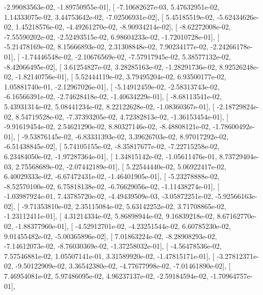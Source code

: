 \documentclass{article}
\begin{document}
         -2.99083563e-02,  -1.89750955e-01],
       [ -7.10682627e-03,   5.47632951e-02,   1.14333075e-02,
          3.44753642e-02,  -7.02506931e-02],
       [  5.45185519e-02,  -5.62434626e-02,   1.45218576e-02,
         -4.49261270e-02,  -8.90934214e-02],
       [ -8.62272008e-02,  -7.55590202e-02,  -2.52493515e-02,
          6.98604233e-02,  -1.72010728e-01],
       [ -5.21478169e-02,   8.15666893e-02,   2.31308848e-02,
          7.90234177e-02,  -2.24266178e-01],
       [ -1.74446548e-02,  -2.10676569e-02,  -7.57917945e-02,
          5.38577132e-02,  -8.42066495e-02],
       [  3.61254827e-02,   3.28285163e-02,  -1.28291736e-02,
          8.92526248e-02,  -1.82140756e-01],
       [  5.52444119e-02,   3.79495204e-02,   6.93500177e-02,
          1.05881740e-01,  -2.12967026e-01],
       [ -5.14912459e-02,  -2.58313743e-02,  -6.16566391e-02,
         -2.74628418e-02,  -1.40634229e-01],
       [ -8.68113541e-02,   5.43931314e-02,   5.08441234e-02,
          8.22122628e-02,  -1.08360367e-01],
       [ -2.18729824e-02,   8.54719528e-02,  -7.37393205e-02,
          4.72382813e-02,  -1.36153454e-01],
       [ -9.91619454e-02,   2.54621290e-02,   8.80327146e-02,
         -8.48808121e-02,  -1.78600492e-01],
       [ -9.53876145e-02,  -6.83331393e-02,   3.39626703e-02,
          8.97017292e-02,  -6.51438845e-02],
       [  5.74105155e-02,  -8.35817677e-02,  -7.22715258e-02,
          6.23484050e-02,  -1.97287364e-01],
       [  1.34815142e-02,  -1.05611476e-01,   8.73729404e-03,
          2.75568689e-02,  -2.07442189e-01],
       [  5.22544440e-02,   5.06922417e-02,   6.40029333e-02,
         -6.67472431e-02,  -1.46401905e-01],
       [ -5.23278888e-02,  -8.52570100e-02,   6.75818138e-02,
         -6.76629056e-02,  -1.11438274e-01],
       [ -1.03987924e-01,   7.43785720e-02,  -4.49439509e-03,
         -3.05872251e-02,  -5.92566163e-02],
       [ -9.71353810e-02,   2.35115084e-02,   5.63142252e-02,
          3.71708865e-02,  -1.23112411e-01],
       [  4.31214334e-02,   5.86898944e-02,   9.16839218e-02,
          8.67162770e-02,  -1.88377960e-01],
       [ -4.52912701e-02,  -4.23251544e-02,   6.60785230e-02,
          9.01455482e-02,  -5.00365896e-02],
       [  7.01863224e-02,  -8.28908293e-02,  -7.14612073e-02,
         -8.76030369e-02,  -1.37258032e-01],
       [ -4.56478536e-02,   7.57546881e-02,   1.05507141e-01,
          3.31589920e-02,  -1.47815171e-01],
       [ -3.27812371e-02,  -9.50122909e-02,   3.36542380e-02,
         -4.77677998e-02,  -7.01461890e-02],
       [  7.46954081e-02,   5.97486095e-02,   4.96237137e-02,
         -2.59184594e-02,  -1.70964757e-01],
\end{document}
